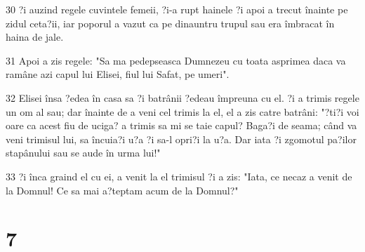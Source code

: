 \par 30 ?i auzind regele cuvintele femeii, ?i-a rupt hainele ?i apoi a trecut înainte pe zidul ceta?ii, iar poporul a vazut ca pe dinauntru trupul sau era îmbracat în haina de jale.
\par 31 Apoi a zis regele: "Sa ma pedepseasca Dumnezeu cu toata asprimea daca va ramâne azi capul lui Elisei, fiul lui Safat, pe umeri".
\par 32 Elisei însa ?edea în casa sa ?i batrânii ?edeau împreuna cu el. ?i a trimis regele un om al sau; dar înainte de a veni cel trimis la el, el a zis catre batrâni: "?ti?i voi oare ca acest fiu de uciga? a trimis sa mi se taie capul? Baga?i de seama; când va veni trimisul lui, sa încuia?i u?a ?i sa-l opri?i la u?a. Dar iata ?i zgomotul pa?ilor stapânului sau se aude în urma lui!"
\par 33 ?i înca graind el cu ei, a venit la el trimisul ?i a zis: "Iata, ce necaz a venit de la Domnul! Ce sa mai a?teptam acum de la Domnul?"

\chapter{7}

